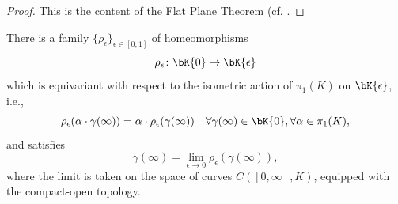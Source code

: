 \documentclass[reqno,11pt]{amsart}
\begin{document}
    \begin{proof}
        This is the content of the Flat Plane Theorem (cf. \cite[Proposition III.H 1.4 and Theorem III.H 1.5]{bridson2011metric}.
    \end{proof}
    \begin{lemma}\label{lem:homeomorphic_boundaries}
        There is a family \(\{\rho_\epsilon\}_{\epsilon \in [0,1]}\) of homeomorphisms 
        \[
            \rho_\epsilon\colon \bK{0} \to \bK{\epsilon}
        \]
        which is equivariant with respect to the isometric action of \(\pi_1(K)\) on \(\bK{\epsilon}\), i.e., 
        \[
            \rho_\epsilon(\alpha\cdot\gamma(\infty)) = \alpha\cdot\rho_\epsilon(\gamma(\infty)) \quad\forall \gamma(\infty) \in \bK{0}, \forall \alpha \in \pi_1(K),
        \]
        and satisfies
        \[
            \gamma(\infty) = \lim_{\epsilon \to 0}\rho_\epsilon(\gamma(\infty)),
        \]
        where the limit is taken on the space of curves \(C([0, \infty], K)\), equipped with the compact-open topology.
    \end{lemma}
\end{document}
